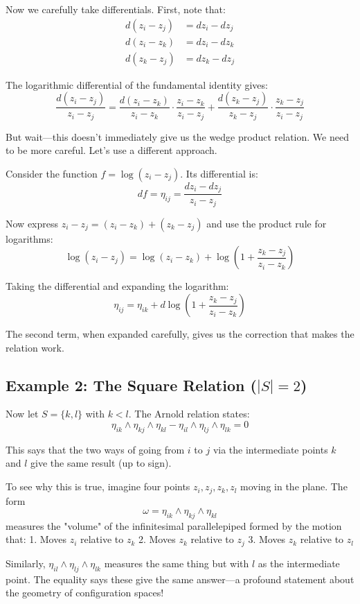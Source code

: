 Now we carefully take differentials. First, note that:
\begin{align}
d(z_i - z_j) &= dz_i - dz_j \\
d(z_i - z_k) &= dz_i - dz_k \\
d(z_k - z_j) &= dz_k - dz_j
\end{align}

The logarithmic differential of the fundamental identity gives:
$$\frac{d(z_i - z_j)}{z_i - z_j} = \frac{d(z_i - z_k)}{z_i - z_k} \cdot \frac{z_i - z_k}{z_i - z_j} + \frac{d(z_k - z_j)}{z_k - z_j} \cdot \frac{z_k - z_j}{z_i - z_j}$$

But wait—this doesn't immediately give us the wedge product relation. We need to be more careful. Let's use a different approach.

Consider the function $f = \log(z_i - z_j)$. Its differential is:
$$df = \eta_{ij} = \frac{dz_i - dz_j}{z_i - z_j}$$

Now express $z_i - z_j = (z_i - z_k) + (z_k - z_j)$ and use the product rule for logarithms:
$$\log(z_i - z_j) = \log(z_i - z_k) + \log\left(1 + \frac{z_k - z_j}{z_i - z_k}\right)$$

Taking the differential and expanding the logarithm:
$$\eta_{ij} = \eta_{ik} + d\log\left(1 + \frac{z_k - z_j}{z_i - z_k}\right)$$

The second term, when expanded carefully, gives us the correction that makes the relation work.

\subsection{Example 2: The Square Relation ($|S| = 2$)}

Now let $S = \{k, l\}$ with $k < l$. The Arnold relation states:
$$\eta_{ik} \wedge \eta_{kj} \wedge \eta_{kl} - \eta_{il} \wedge \eta_{lj} \wedge \eta_{lk} = 0$$

This says that the two ways of going from $i$ to $j$ via the intermediate points $k$ and $l$ give the same result (up to sign).

To see why this is true, imagine four points $z_i, z_j, z_k, z_l$ moving in the plane. The form 
$$\omega = \eta_{ik} \wedge \eta_{kj} \wedge \eta_{kl}$$
measures the "volume" of the infinitesimal parallelepiped formed by the motion that:
1. Moves $z_i$ relative to $z_k$
2. Moves $z_k$ relative to $z_j$  
3. Moves $z_k$ relative to $z_l$

Similarly, $\eta_{il} \wedge \eta_{lj} \wedge \eta_{lk}$ measures the same thing but with $l$ as the intermediate point. The equality says these give the same answer—a profound statement about the geometry of configuration spaces!

